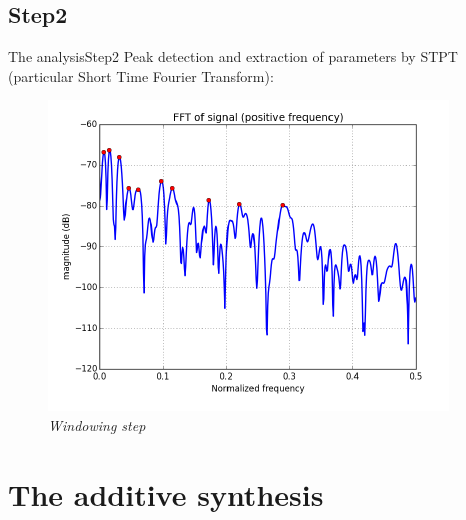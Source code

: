 \documentclass[10pt]{beamer}
\begin{document}
\subsection{Step2}
\begin{frame}{The analysis}{Step2}
Peak detection and extraction of parameters by STPT (particular Short Time Fourier Transform):
\begin{figure}
	\centerline
	{\includegraphics[scale=0.5]{slide2.png}}
	\caption{\it Windowing step}
\end{figure}
\end{frame}
\section{The additive synthesis}
\end{document}
